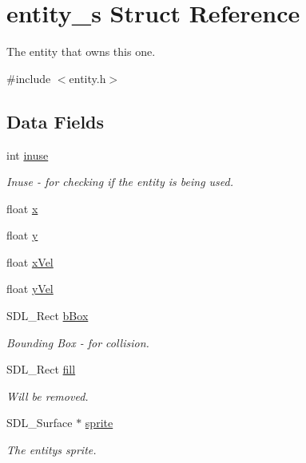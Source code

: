 \hypertarget{structentity__s}{}\section{entity\+\_\+s Struct Reference}
\label{structentity__s}


The entity that owns this one.  




{\ttfamily \#include $<$entity.\+h$>$}

\subsection*{Data Fields}
\begin{DoxyCompactItemize}
\item 
int \hyperlink{structentity__s_a679cabe3b846f2e363f43d8e57433834}{inuse}
\begin{DoxyCompactList}\small\item\em Inuse -\/ for checking if the entity is being used. \end{DoxyCompactList}\item 
float \hyperlink{structentity__s_ad0da36b2558901e21e7a30f6c227a45e}{x}
\item 
float \hyperlink{structentity__s_aa4f0d3eebc3c443f9be81bf48561a217}{y}
\item 
float \hyperlink{structentity__s_a68ba7133c5359e424ce5d727d9665a25}{x\+Vel}
\item 
float \hyperlink{structentity__s_ada909419c1e8025397fcbba8a9e65a26}{y\+Vel}
\item 
S\+D\+L\+\_\+\+Rect \hyperlink{structentity__s_a8df2e6a526b260ce0a46bbe60c16f4a8}{b\+Box}
\begin{DoxyCompactList}\small\item\em Bounding Box -\/ for collision. \end{DoxyCompactList}\item 
S\+D\+L\+\_\+\+Rect \hyperlink{structentity__s_a5de6327fc6879218213f1741891b8c52}{fill}
\begin{DoxyCompactList}\small\item\em Will be removed. \end{DoxyCompactList}\item 
S\+D\+L\+\_\+\+Surface $\ast$ \hyperlink{structentity__s_a1c7252614a33238e51edd3bbd5fa08c5}{sprite}
\begin{DoxyCompactList}\small\item\em The entity\textquotesingle{}s sprite. \end{DoxyCompactList}\item 

\end{DoxyCompactItemize}
